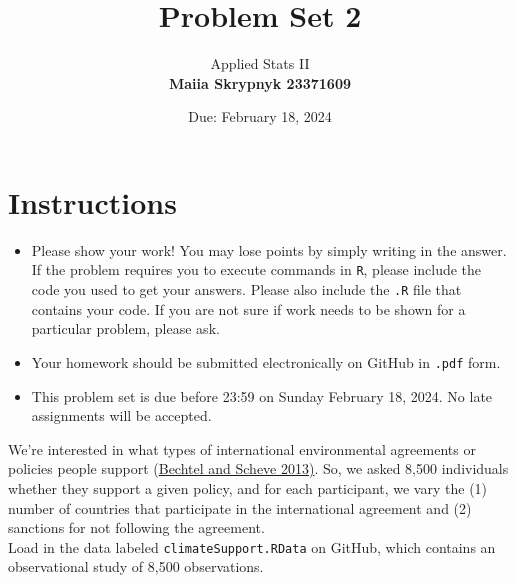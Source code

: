 \documentclass[12pt,letterpaper]{article}
\title{Problem Set 2}
\date{Due: February 18, 2024}
\author{Applied Stats II \\ \vspace{\baselineskip}
	\textbf{Maiia Skrypnyk 23371609}}
\begin{document}
	\maketitle
	\section*{Instructions}
	\begin{itemize}
		\item Please show your work! You may lose points by simply writing in the answer. If the problem requires you to execute commands in \texttt{R}, please include the code you used to get your answers. Please also include the \texttt{.R} file that contains your code. If you are not sure if work needs to be shown for a particular problem, please ask.
		\item Your homework should be submitted electronically on GitHub in \texttt{.pdf} form.
		\item This problem set is due before 23:59 on Sunday February 18, 2024. No late assignments will be accepted.
	\end{itemize}

	
	

	\vspace{.25cm}
\noindent We're interested in what types of international environmental agreements or policies people support (\href{https://www.pnas.org/content/110/34/13763}{Bechtel and Scheve 2013)}. So, we asked 8,500 individuals whether they support a given policy, and for each participant, we vary the (1) number of countries that participate in the international agreement and (2) sanctions for not following the agreement. \\

\noindent Load in the data labeled \texttt{climateSupport.RData} on GitHub, which contains an observational study of 8,500 observations.
\end{document}
